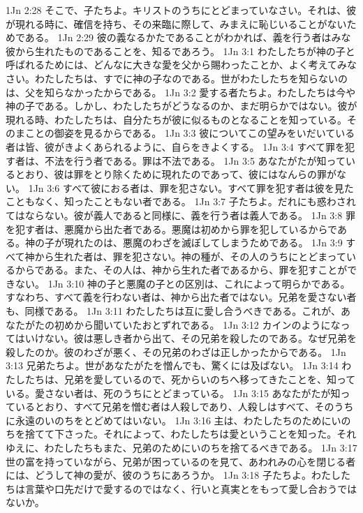 1Jn 2:28  そこで、子たちよ。キリストのうちにとどまっていなさい。それは、彼が現れる時に、確信を持ち、その来臨に際して、みまえに恥じいることがないためである。
1Jn 2:29  彼の義なるかたであることがわかれば、義を行う者はみな彼から生れたものであることを、知るであろう。
1Jn 3:1  わたしたちが神の子と呼ばれるためには、どんなに大きな愛を父から賜わったことか、よく考えてみなさい。わたしたちは、すでに神の子なのである。世がわたしたちを知らないのは、父を知らなかったからである。
1Jn 3:2  愛する者たちよ。わたしたちは今や神の子である。しかし、わたしたちがどうなるのか、まだ明らかではない。彼が現れる時、わたしたちは、自分たちが彼に似るものとなることを知っている。そのまことの御姿を見るからである。
1Jn 3:3  彼についてこの望みをいだいている者は皆、彼がきよくあられるように、自らをきよくする。
1Jn 3:4  すべて罪を犯す者は、不法を行う者である。罪は不法である。
1Jn 3:5  あなたがたが知っているとおり、彼は罪をとり除くために現れたのであって、彼にはなんらの罪がない。
1Jn 3:6  すべて彼におる者は、罪を犯さない。すべて罪を犯す者は彼を見たこともなく、知ったこともない者である。
1Jn 3:7  子たちよ。だれにも惑わされてはならない。彼が義人であると同様に、義を行う者は義人である。
1Jn 3:8  罪を犯す者は、悪魔から出た者である。悪魔は初めから罪を犯しているからである。神の子が現れたのは、悪魔のわざを滅ぼしてしまうためである。
1Jn 3:9  すべて神から生れた者は、罪を犯さない。神の種が、その人のうちにとどまっているからである。また、その人は、神から生れた者であるから、罪を犯すことができない。
1Jn 3:10  神の子と悪魔の子との区別は、これによって明らかである。すなわち、すべて義を行わない者は、神から出た者ではない。兄弟を愛さない者も、同様である。
1Jn 3:11  わたしたちは互に愛し合うべきである。これが、あなたがたの初めから聞いていたおとずれである。
1Jn 3:12  カインのようになってはいけない。彼は悪しき者から出て、その兄弟を殺したのである。なぜ兄弟を殺したのか。彼のわざが悪く、その兄弟のわざは正しかったからである。
1Jn 3:13  兄弟たちよ。世があなたがたを憎んでも、驚くには及ばない。
1Jn 3:14  わたしたちは、兄弟を愛しているので、死からいのちへ移ってきたことを、知っている。愛さない者は、死のうちにとどまっている。
1Jn 3:15  あなたがたが知っているとおり、すべて兄弟を憎む者は人殺しであり、人殺しはすべて、そのうちに永遠のいのちをとどめてはいない。
1Jn 3:16  主は、わたしたちのためにいのちを捨てて下さった。それによって、わたしたちは愛ということを知った。それゆえに、わたしたちもまた、兄弟のためにいのちを捨てるべきである。
1Jn 3:17  世の富を持っていながら、兄弟が困っているのを見て、あわれみの心を閉じる者には、どうして神の愛が、彼のうちにあろうか。
1Jn 3:18  子たちよ。わたしたちは言葉や口先だけで愛するのではなく、行いと真実とをもって愛し合おうではないか。

